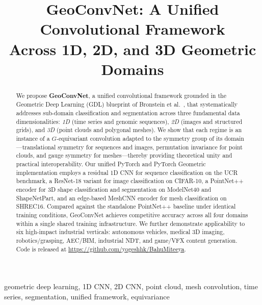 \documentclass[10pt,conference]{IEEEtran}
\begin{document}
\title{GeoConvNet: A Unified Convolutional Framework\\
       Across 1D, 2D, and 3D Geometric Domains}

\author{%
}

\maketitle

\begin{abstract}
We propose \textbf{GeoConvNet}, a unified convolutional framework grounded
in the Geometric Deep Learning (GDL) blueprint of Bronstein et
al.~\cite{bronstein2021geometric}, that systematically addresses sub-domain
classification and segmentation across three fundamental data
dimensionalities: \emph{1D} (time series and genomic sequences), \emph{2D}
(images and structured grids), and \emph{3D} (point clouds and polygonal
meshes). We show that each regime is an instance of a $G$-equivariant
convolution adapted to the symmetry group of its domain---translational
symmetry for sequences and images, permutation invariance for point clouds,
and gauge symmetry for meshes---thereby providing theoretical unity and
practical interoperability. Our unified PyTorch and PyTorch Geometric
implementation employs a residual 1D CNN for sequence classification on the
UCR benchmark, a ResNet-18 variant for image classification on CIFAR-10, a
PointNet++ encoder for 3D shape classification and segmentation on
ModelNet40 and ShapeNetPart, and an edge-based MeshCNN encoder for mesh
classification on SHREC16. Compared against the standalone PointNet++
baseline under identical training conditions, GeoConvNet achieves
competitive accuracy across all four domains within a single shared
training infrastructure. We further demonstrate applicability to six
high-impact industrial verticals: autonomous vehicles, medical 3D imaging,
robotics/grasping, AEC/BIM, industrial NDT, and game/VFX content
generation. Code is released at
\url{https://github.com/yogeshhk/BahuMiteeya}.
\end{abstract}

\begin{IEEEkeywords}
geometric deep learning, 1D CNN, 2D CNN, point cloud, mesh convolution,
time series, segmentation, unified framework, equivariance
\end{IEEEkeywords}
\end{document}
